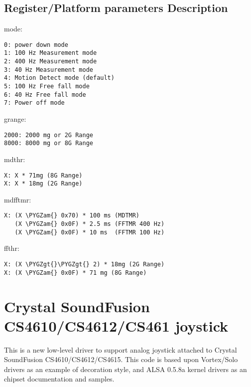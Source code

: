 \documentclass[a4paper,8pt,english]{sphinxmanual}
\def\PYGZam{\char`\&}
\def\PYGZgt{\char`\>}
\begin{document}
\subsection{Register/Platform parameters Description}
\label{input/devices/cma3000_d0x:register-platform-parameters-description}
mode:

\begin{Verbatim}[commandchars=\\\{\}]
0: power down mode
1: 100 Hz Measurement mode
2: 400 Hz Measurement mode
3: 40 Hz Measurement mode
4: Motion Detect mode (default)
5: 100 Hz Free fall mode
6: 40 Hz Free fall mode
7: Power off mode
\end{Verbatim}

grange:

\begin{Verbatim}[commandchars=\\\{\}]
2000: 2000 mg or 2G Range
8000: 8000 mg or 8G Range
\end{Verbatim}

mdthr:

\begin{Verbatim}[commandchars=\\\{\}]
X: X * 71mg (8G Range)
X: X * 18mg (2G Range)
\end{Verbatim}

mdfftmr:

\begin{Verbatim}[commandchars=\\\{\}]
X: (X \PYGZam{} 0x70) * 100 ms (MDTMR)
   (X \PYGZam{} 0x0F) * 2.5 ms (FFTMR 400 Hz)
   (X \PYGZam{} 0x0F) * 10 ms  (FFTMR 100 Hz)
\end{Verbatim}

ffthr:

\begin{Verbatim}[commandchars=\\\{\}]
X: (X \PYGZgt{}\PYGZgt{} 2) * 18mg (2G Range)
X: (X \PYGZam{} 0x0F) * 71 mg (8G Range)
\end{Verbatim}


\section{Crystal SoundFusion CS4610/CS4612/CS461 joystick}
\label{input/devices/cs461x::doc}\label{input/devices/cs461x:crystal-soundfusion-cs4610-cs4612-cs461-joystick}
This is a new low-level driver to support analog joystick attached to
Crystal SoundFusion CS4610/CS4612/CS4615. This code is based upon
Vortex/Solo drivers as an example of decoration style, and ALSA
0.5.8a kernel drivers as an chipset documentation and samples.
\end{document}
